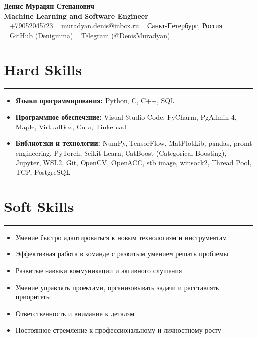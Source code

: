 \documentclass[a4paper,14pt]{article}
\begin{document}
\begin{center}
    {\Huge \bfseries Денис Мурадян Степанович} \\
    \vspace{0.5em}
    {\Large \bfseries Machine Learning and Software Engineer} \\
    \vspace{1em}
    \faPhone~ +79052045723 \hspace{1em}
    \faEnvelope~ muradyan.denis@inbox.ru \hspace{1em}
    \faHome~ Санкт-Петербург, Россия \\
    \vspace{0.5em}
    \faGithub~ \href{https://github.com/Denigmma}{GitHub (Denigmma)} \hspace{1em}
    \faTelegram~ \href{https://t.me/DenisMuradyan}{Telegram (@DenisMuradyan)}
\end{center}

\section*{Hard Skills}
\hrule
\vspace{0.5em}
\begin{itemize}
    \item \textbf{Языки программирования:} Python, C, C++, SQL
    \item \textbf{Программное обеспечение:} Visual Studio Code, PyCharm, PgAdmin 4, Maple, VirtualBox, Cura, Tinkercad
    \item \textbf{Библиотеки и технологии:} NumPy, TensorFlow, MatPlotLib, pandas, promt engineering, PyTorch, Scikit-Learn, CatBoost (Categorical Boosting), Jupyter, WSL2, Git, OpenCV, OpenACC, stb image, winsock2, Thread Pool, TCP, PostgreSQL
\end{itemize}

\section*{Soft Skills}
\hrule
\vspace{0.5em}
\begin{itemize}
    \item Умение быстро адаптироваться к новым технологиям и инструментам
    \item Эффективная работа в команде с развитым умением решать проблемы
    \item Развитые навыки коммуникации и активного слушания
    \item Умение управлять проектами, организовывать задачи и расставлять приоритеты
    \item Ответственность и внимание к деталям
    \item Постоянное стремление к профессиональному и личностному росту
\end{itemize}
\end{document}

